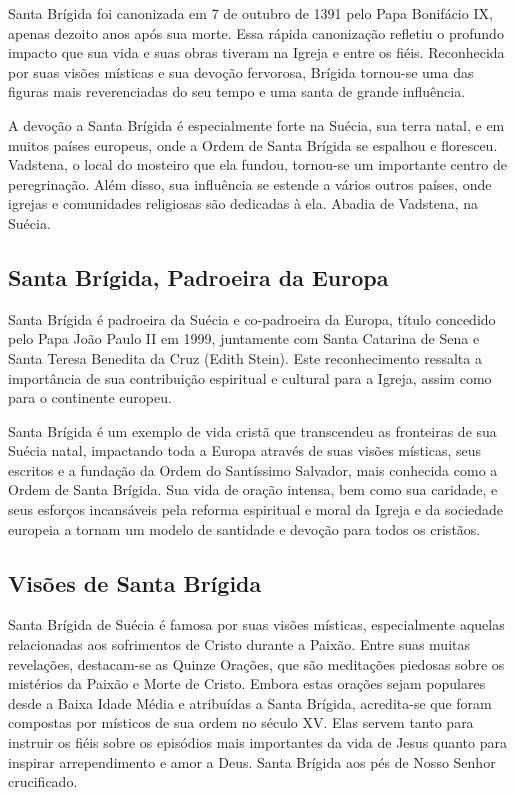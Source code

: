 \documentclass[a4paper,12pt]{extarticle} \usepackage[utf8]{inputenc}
\begin{document}
Santa Brígida foi canonizada em 7 de outubro de 1391 pelo Papa Bonifácio IX, apenas dezoito anos após sua morte. Essa rápida canonização refletiu o profundo impacto que sua vida e suas obras tiveram na Igreja e entre os fiéis. Reconhecida por suas visões místicas e sua devoção fervorosa, Brígida tornou-se uma das figuras mais reverenciadas do seu tempo e uma santa de grande influência.

A devoção a Santa Brígida é especialmente forte na Suécia, sua terra natal, e em muitos países europeus, onde a Ordem de Santa Brígida se espalhou e floresceu. Vadstena, o local do mosteiro que ela fundou, tornou-se um importante centro de peregrinação. Além disso, sua influência se estende a vários outros países, onde igrejas e comunidades religiosas são dedicadas à ela.
Abadia de Vadstena, na Suécia.

\subsection{Santa Brígida, Padroeira da Europa}

Santa Brígida é padroeira da Suécia e co-padroeira da Europa, título concedido pelo Papa João Paulo II em 1999, juntamente com Santa Catarina de Sena e Santa Teresa Benedita da Cruz (Edith Stein). Este reconhecimento ressalta a importância de sua contribuição espiritual e cultural para a Igreja, assim como para o continente europeu.

Santa Brígida é um exemplo de vida cristã que transcendeu as fronteiras de sua Suécia natal, impactando toda a Europa através de suas visões místicas, seus escritos e a fundação da Ordem do Santíssimo Salvador, mais conhecida como a Ordem de Santa Brígida. Sua vida de oração intensa, bem como sua caridade, e seus esforços incansáveis pela reforma espiritual e moral da Igreja e da sociedade europeia a tornam um modelo de santidade e devoção para todos os cristãos.

\subsection{Visões de Santa Brígida}

Santa Brígida de Suécia é famosa por suas visões místicas, especialmente aquelas relacionadas aos sofrimentos de Cristo durante a Paixão. Entre suas muitas revelações, destacam-se as Quinze Orações, que são meditações piedosas sobre os mistérios da Paixão e Morte de Cristo. Embora estas orações sejam populares desde a Baixa Idade Média e atribuídas a Santa Brígida, acredita-se que foram compostas por místicos de sua ordem no século XV. Elas servem tanto para instruir os fiéis sobre os episódios mais importantes da vida de Jesus quanto para inspirar arrependimento e amor a Deus.
Santa Brígida aos pés de Nosso Senhor crucificado.
\end{document}
